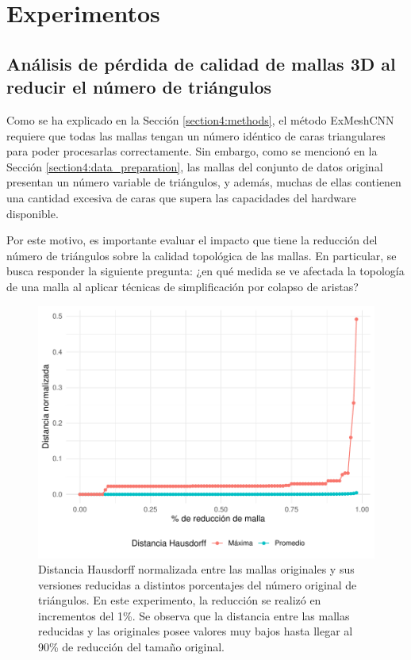 \section{Experimentos}

\subsection{Análisis de pérdida de calidad de mallas 3D al reducir el número de triángulos}
\label{section5:experiment_edge_collapse}
Como se ha explicado en la Sección \ref{section4:methods}, el método ExMeshCNN requiere que todas las mallas tengan un número idéntico de caras triangulares para poder procesarlas correctamente. Sin embargo, como se mencionó en la Sección \ref{section4:data_preparation}, las mallas del conjunto de datos original presentan un número variable de triángulos, y además, muchas de ellas contienen una cantidad excesiva de caras que supera las capacidades del hardware disponible.

Por este motivo, es importante evaluar el impacto que tiene la reducción del número de triángulos sobre la calidad topológica de las mallas. En particular, se busca responder la siguiente pregunta: ¿en qué medida se ve afectada la topología de una malla al aplicar técnicas de simplificación por colapso de aristas?

\begin{figure}[h]
    \centering
    \includegraphics[width=\linewidth]{figures/5_experiments/mesh_redux_study.pdf}
    \caption[Estudio de reducción de mallas]{Distancia Hausdorff normalizada entre las mallas originales y sus versiones reducidas a distintos porcentajes del número original de triángulos. En este experimento, la reducción se realizó en incrementos del 1\%. Se observa que la distancia entre las mallas reducidas y las originales posee valores muy bajos hasta llegar al 90\% de reducción del tamaño original.}
    \label{fig5:redux_study}
\end{figure}

